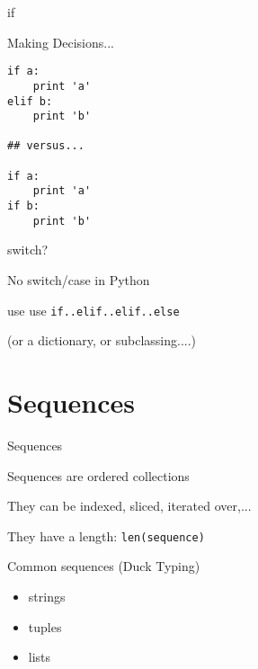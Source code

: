 \documentclass{beamer}
\begin{document}
\begin{frame}[fragile]{if}

{\Large Making Decisions...}
\begin{verbatim}
if a:
    print 'a'
elif b:
    print 'b'

## versus...

if a:
    print 'a'
if b:
    print 'b'
\end{verbatim}

\end{frame}

\begin{frame}[fragile]{switch?}

\vfill
{\Large No switch/case in Python}

\vfill
{\Large use use \verb|if..elif..elif..else|}

\vfill

(or a dictionary, or subclassing....)
\end{frame}

%
%
%
%
%

\section {Sequences}

\begin{frame}[fragile]{Sequences}

{\Large Sequences are ordered collections}

\vfill
{\Large They can be indexed, sliced, iterated over,...}

\vfill
{\Large They have a length:  \verb+len(sequence)+}

\vfill
{\Large Common sequences (Duck Typing)}

\begin{itemize}
   \item strings
   \item tuples
   \item lists
\end{itemize}

\end{frame}
\end{document}
